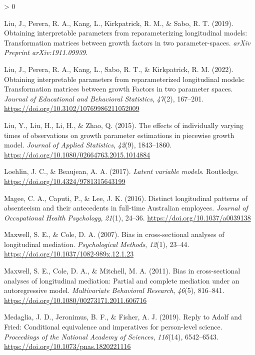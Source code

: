\documentclass[
12pt, %
twoside,
english]{guelphthesis}
\newlength{\cslhangindent}
\newenvironment{CSLReferences}[2] %
 {%
  \setlength{\parindent}{0pt}
  \ifodd #1 \everypar{\setlength{\hangindent}{\cslhangindent}}\ignorespaces\fi
  \ifnum #2 > 0
  \setlength{\parskip}{\linespacing{2}}
  \fi
 }%
 {}
\theoremstyle{definition}
\theoremstyle{definition}
\theoremstyle{definition}
\theoremstyle{definition}
\theoremstyle{remark}
\begin{document}
\begin{CSLReferences}{1}{0}
\leavevmode{}%
Liu, J., Perera, R. A., Kang, L., Kirkpatrick, R. M., \& Sabo, R. T. (2019). Obtaining interpretable parameters from reparameterizing longitudinal models: Transformation matrices between growth factors in two parameter-spaces. \emph{arXiv Preprint arXiv:1911.09939}.

\leavevmode{}%
Liu, J., Perera, R. A., Kang, L., Sabo, R. T., \& Kirkpatrick, R. M. (2022). Obtaining interpretable parameters from reparameterized longitudinal models: Transformation matrices between growth Factors in two parameter spaces. \emph{Journal of Educational and Behavioral Statistics}, \emph{47}(2), 167--201. \url{https://doi.org/10.3102/10769986211052009}

\leavevmode{}%
Liu, Y., Liu, H., Li, H., \& Zhao, Q. (2015). The effects of individually varying times of observations on growth parameter estimations in piecewise growth model. \emph{Journal of Applied Statistics}, \emph{42}(9), 1843--1860. \url{https://doi.org/10.1080/02664763.2015.1014884}

\leavevmode{}%
Loehlin, J. C., \& Beaujean, A. A. (2017). \emph{Latent variable models}. Routledge. \url{https://doi.org/10.4324/9781315643199}

\leavevmode{}%
Magee, C. A., Caputi, P., \& Lee, J. K. (2016). Distinct longitudinal patterns of absenteeism and their antecedents in full-time Australian employees. \emph{Journal of Occupational Health Psychology}, \emph{21}(1), 24--36. \url{https://doi.org/10.1037/a0039138}

\leavevmode{}%
Maxwell, S. E., \& Cole, D. A. (2007). Bias in cross-sectional analyses of longitudinal mediation. \emph{Psychological Methods}, \emph{12}(1), 23--44. \url{https://doi.org/10.1037/1082-989x.12.1.23}

\leavevmode{}%
Maxwell, S. E., Cole, D. A., \& Mitchell, M. A. (2011). Bias in cross-sectional analyses of longitudinal mediation: Partial and complete mediation under an autoregressive model. \emph{Multivariate Behavioral Research}, \emph{46}(5), 816--841. \url{https://doi.org/10.1080/00273171.2011.606716}

\leavevmode{}%
Medaglia, J. D., Jeronimus, B. F., \& Fisher, A. J. (2019). Reply to Adolf and Fried: Conditional equivalence and imperatives for person-level science. \emph{Proceedings of the National Academy of Sciences}, \emph{116}(14), 6542--6543. \url{https://doi.org/10.1073/pnas.1820221116}


\end{CSLReferences}
\end{document}
